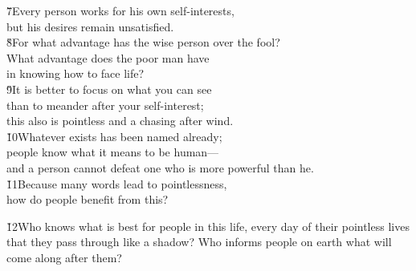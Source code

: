 \begin{poetry}
\poeml \v{7}Every person works for his own self-interests, \\
\poemll    but his desires remain unsatisfied. \\
\poeml \v{8}For what advantage has the wise person over the fool? \\
\poemll    What advantage does the poor man have \\
\poemlll       in knowing how to face life? \\
\poeml \v{9}It is better to focus on what you can see \\
\poemll    than to meander after your self-interest; \\
\poemlll       this also is pointless and a chasing after wind. \\
\poeml \v{10}Whatever exists has been named already; \\
\poemll    people know what it means to be human--- \\
\poemlll       and a person cannot defeat one who is more powerful than he. \\
\poeml \v{11}Because many words lead to pointlessness, \\
\poemll    how do people benefit from this?
\end{poetry}

\v{12}Who knows what is best for people in this life, every day of their pointless lives that they pass through like a shadow? Who informs people on earth what will come along after them?

